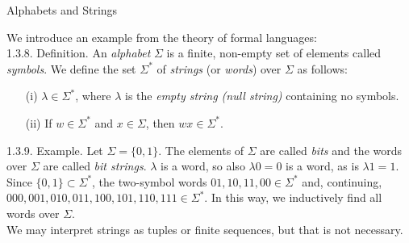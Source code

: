 \documentclass[smaller,hyperref={CJKbookmarks=true}]{beamer}
\begin{document}
\begin{frame}[t,label=1.3.8]{Alphabets and Strings}
\begin{spacing}{1.05}
We introduce an example from the theory of formal languages:\\[6pt]
\alert{1.3.8. Definition.} An \emph{alphabet} $\Sigma$ is a finite, non-empty set of elements called \emph{symbols}. We define the set $\Sigma^*$ of \emph{strings} (or \emph{words}) over $\Sigma$ as follows:
\begin{itemize}
  \item[(i)] $\lambda\in\Sigma^*$, where $\lambda$ is the \emph{empty string (null string)} containing no symbols.
  \item[(ii)] If $w\in\Sigma^*$ and $x\in\Sigma$, then $wx\in\Sigma^*$.
\end{itemize}
\vspace*{6pt}
\alert{1.3.9. Example.} Let $\Sigma=\{0,1\}$. The elements of $\Sigma$ are called \emph{bits} and the words over $\Sigma$ are called \emph{bit strings}. $\lambda$ is a word, so also $\lambda0=0$ is a word, as is $\lambda1=1$. Since $\{0,1\}\subset\Sigma^*$, the two-symbol words $01,10,11,00\in\Sigma^*$ and, continuing, $000,001,010,011,100,101,110,111\in\Sigma^*$. In this way, we inductively find all words over $\Sigma$.\\[5pt]
We may interpret strings as tuples or finite sequences, but that is not
necessary.
\end{spacing}
\end{frame}
\end{document}
